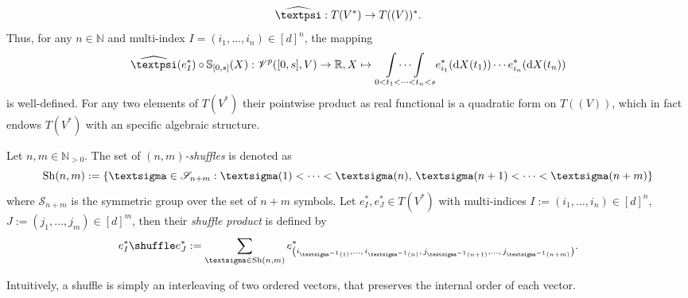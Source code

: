 \documentclass[openany]{book}
\begin{document}
\begin{equation*}
    \widehat{\gpsi}:T(V^\ast)\to T((V))^\ast.
\end{equation*}
Thus, for any $n\in \mathbb N$ and multi-index $I=(i_1,\dots,i_n)\in [d]^n$, the mapping
\begin{equation*}
    \widehat{\gpsi}(e^\ast_I)\circ \mathbb S_{[0,s]}(X):\mathscr V^p([0,s], V)\to \mathbb R, X\mapsto \underset{0<t_1<\cdots <t_n<s}{\int \cdots \int} e_{i_1}^\ast(\mathrm dX(t_1))\cdots e_{i_n}^\ast(\mathrm dX(t_n))
\end{equation*}
is well-defined. For any two elements of $T(V^\ast)$ their pointwise product as real functional is a quadratic form on $T((V))$, which in fact endows $T(V^\ast)$ with an specific algebraic structure.
\begin{definition}
    Let $n,m\in \mathbb N_{>0}$. The set of $(n,m)$\textit{-shuffles} is denoted as 
    \begin{equation*}
        \mathrm{Sh}(n,m):=\{\gsigma \in \mathscr S_{n+m}:\gsigma (1)< \cdots <\gsigma(n),\,\gsigma(n+1)<\cdots <\gsigma(n+m)\}
    \end{equation*}
    where $\mathscr S_{n+m}$ is the symmetric group over the set of $n+m$ symbols. Let $e^\ast_I, e^\ast_J\in T(V^\ast)$ with multi-indices $I:=(i_1,\dots, i_n)\in [d]^n$, $J:=(j_1,\dots,j_m)\in [d]^m$, then their \textit{shuffle product} is defined by
    \begin{equation*}
        e^\ast_I\shuffle e^\ast_J:=\sum_{\gsigma \in \mathrm{Sh}(n,m)}e^{\ast}_{\left(i_{\gsigma^{-1}(1)},\dots,\,i_{\gsigma^{-1}(n)},\,j_{\gsigma^{-1}(n+1)},\dots,\,j_{\gsigma^{-1}(n+m)}\right)}.
    \end{equation*}
\end{definition}
Intuitively, a shuffle is simply an interleaving of two ordered vectors, that preserves the internal order of each vector.
\end{document}
